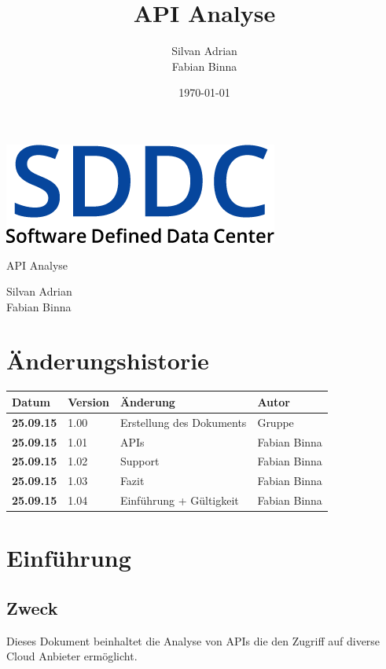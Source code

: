 \documentclass[11pt]{scrartcl}
\title{API Analyse}
\author{Silvan Adrian \\ Fabian Binna}
\date{\today{}}
\begin{document}
\def\arraystretch{1.5}
\begin{titlepage}
\begin{center}
\vspace{10em}
\includegraphics[scale=2]{SDDC}
\vspace{10em}
\end{center}
\begin{center}
\huge {API Analyse}
\end{center}
\begin{center}
\vspace{10em}
\LARGE {Silvan Adrian} \\
\LARGE {Fabian Binna}
\end{center}

\end{titlepage}

\newpage
\section{Änderungshistorie}
\begin{tabularx}{\linewidth}{l l l l}
\textbf{Datum} & \textbf{Version} & \textbf{Änderung}  & \textbf{Autor} \\
\hline
\textbf{25.09.15} & 1.00 & Erstellung des Dokuments & Gruppe \\
\textbf{25.09.15} & 1.01 & APIs & Fabian Binna\\
\textbf{25.09.15} & 1.02 & Support & Fabian Binna\\
\textbf{25.09.15} & 1.03 & Fazit & Fabian Binna\\
\textbf{25.09.15} & 1.04 & Einführung + Gültigkeit & Fabian Binna\\

\end{tabularx}

\newpage
\tableofcontents
\newpage

\section{Einführung}
\subsection{Zweck}
Dieses Dokument beinhaltet die Analyse von APIs die den Zugriff auf diverse Cloud Anbieter ermöglicht.
\end{document}
